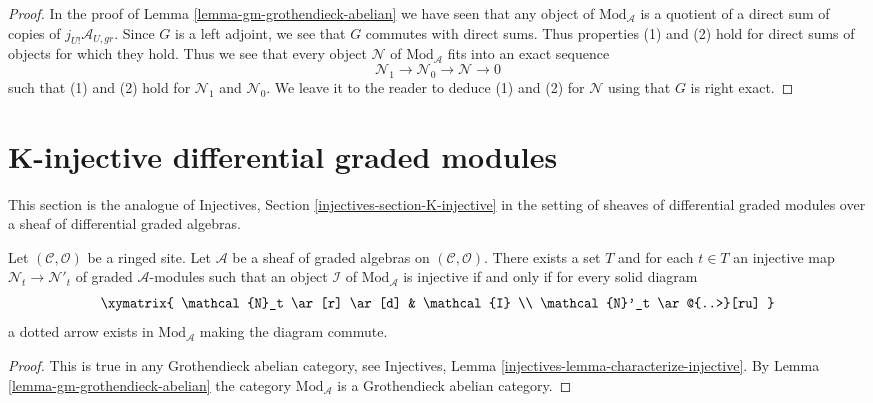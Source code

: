 \begin{proof}
\medskip\noindent
In the proof of Lemma \ref{lemma-gm-grothendieck-abelian}
we have seen that any object
of $\text{Mod}_\mathcal{A}$ is a quotient of a direct sum
of copies of $j_{U!}\mathcal{A}_{U, gr}$. Since $G$ is a left
adjoint, we see that $G$ commutes with direct sums. Thus
properties (1) and (2) hold for direct sums of objects
for which they hold. Thus we see that every object $\mathcal{N}$
of $\text{Mod}_\mathcal{A}$ fits into an exact sequence
$$
\mathcal{N}_1 \to \mathcal{N}_0 \to \mathcal{N} \to 0
$$
such that (1) and (2) hold for $\mathcal{N}_1$ and $\mathcal{N}_0$.
We leave it to the reader to deduce (1) and (2) for
$\mathcal{N}$ using that $G$ is right exact.
\end{proof}









\section{K-injective differential graded modules}
\label{section-K-injective}

\noindent
This section is the analogue of
Injectives, Section \ref{injectives-section-K-injective}
in the setting of sheaves of differential graded modules
over a sheaf of differential graded algebras.

\begin{lemma}
\label{lemma-characterize-injectives}
Let $(\mathcal{C}, \mathcal{O})$ be a ringed site. Let $\mathcal{A}$
be a sheaf of graded algebras on $(\mathcal{C}, \mathcal{O})$.
There exists a set $T$ and for each $t \in T$ an injective map
$\mathcal{N}_t \to \mathcal{N}'_t$ of graded $\mathcal{A}$-modules
such that an object $\mathcal{I}$ of $\text{Mod}_\mathcal{A}$
is injective if and only if for every solid diagram
$$
\xymatrix{
\mathcal{N}_t \ar[r] \ar[d] & \mathcal{I} \\
\mathcal{N}'_t \ar@{..>}[ru]
}
$$
a dotted arrow exists in $\text{Mod}_\mathcal{A}$ making the diagram commute.
\end{lemma}

\begin{proof}
This is true in any Grothendieck abelian category, see
Injectives, Lemma \ref{injectives-lemma-characterize-injective}.
By Lemma \ref{lemma-gm-grothendieck-abelian} the category
$\text{Mod}_\mathcal{A}$ is a Grothendieck abelian category.
\end{proof}

